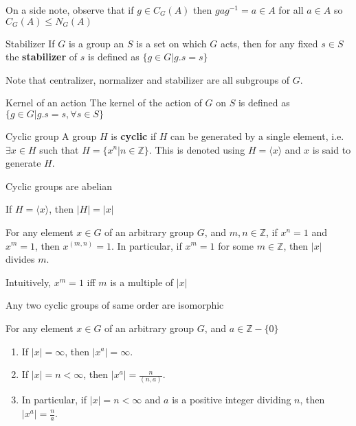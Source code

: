 \documentclass[titlepage, 12pt]{book}
\begin{document}
On a side note, observe that if $g\in C_G(A)$ then $gag^{-1} = a\in A$ for all
$a\in A$ so $C_G(A)\le N_G(A)$

\begin{definition}{Stabilizer}{}
    If $G$ is a group an $S$ is a set on which $G$ acts, then for any fixed
    $s\in S$ the \textbf{stabilizer} of $s$ is defined as $\{g\in G| g.s=s\}$
\end{definition}
Note that centralizer, normalizer and stabilizer are all subgroups of $G$.

\begin{definition}{Kernel of an action}{}
    The kernel of the action of $G$ on $S$ is defined as $\{g\in G| g.s = s,
    \forall s\in S\}$
\end{definition}
\begin{definition}{Cyclic group}{}
    A group $H$ is \textbf{cyclic} if $H$ can be generated by a single element,
    i.e. $\exists x\in H$ such that $H = \{x^n| n\in \mathbb{Z}\}$. This is denoted
    using $H = \langle x\rangle$ and $x$ is said to generate $H$.
\end{definition}
\begin{proposition}{}{}
    Cyclic groups are abelian
\end{proposition}
\begin{proposition}{}{}
    If $H = \langle x\rangle$, then $| H| = | x|$
\end{proposition}
\begin{proposition}{}{}
    For any element $x\in G$ of an arbitrary group $G$, and $m, n\in
        \mathbb{Z}$,
        if $x^n = 1$ and $x^m = 1$, then $x^{(m, n)} = 1$. In particular, if
        $x^m = 1$ for some $m\in \mathbb{Z}$, then $|x|$ divides $m$.
\end{proposition}
Intuitively, $x^m = 1$ iff $m$ is a multiple of $|x|$
\begin{proposition}{}{}
    Any two cyclic groups of same order are isomorphic
\end{proposition}
\begin{proposition}{}{}
    For any element $x\in G$ of an arbitrary group $G$, and $a\in
        \mathbb{Z} - \{0\}$
        \begin{enumerate}
            \item If $|x| = \infty$, then $|x^a| = \infty$.
            \item If $|x| = n < \infty$, then $|x^a| = \frac{n}{(n, a)}$.
            \item In particular, if $|x| = n < \infty$ and $a$ is a positive integer
                dividing $n$, then $|x^a| = \frac{n}{a}$.
        \end{enumerate}
\end{proposition}
\end{document}
